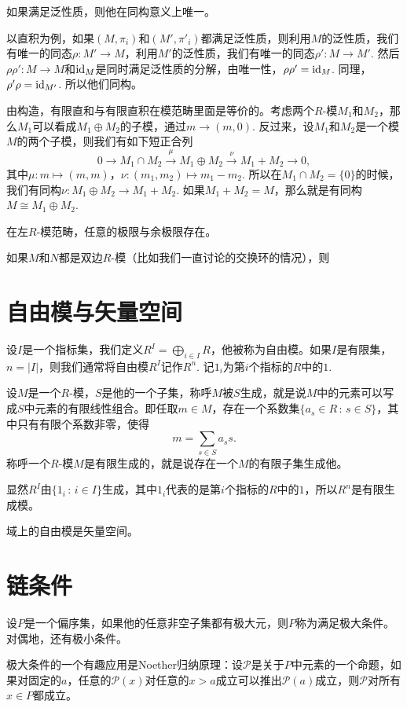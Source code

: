 \para 如果满足泛性质，则他在同构意义上唯一。

以直积为例，如果$(M,\pi_i)$和$(M',\pi'_i)$都满足泛性质，则利用$M$的泛性质，我们有唯一的同态$\rho:M'\to M$，利用$M'$的泛性质，我们有唯一的同态$\rho':M\to M'$. 然后$\rho \rho':M\to M$和$\operatorname{id}_M$是同时满足泛性质的分解，由唯一性，$\rho\rho'=\operatorname{id}_M$. 同理，$\rho'\rho=\operatorname{id}_{M'}$. 所以他们同构。

\para 由构造，有限直和与有限直积在模范畴里面是等价的。考虑两个$R$-模$M_1$和$M_2$，那么$M_1$可以看成$M_1\oplus M_2$的子模，通过$m\to (m,0)$. 反过来，设$M_1$和$M_2$是一个模$M$的两个子模，则我们有如下短正合列
\[
	0\to M_1\cap M_2 \xrightarrow{\mu} M_1\oplus M_2\xrightarrow{\nu} M_1+M_2\to 0,
\]
其中$\mu:m\mapsto (m,m)$，$\nu:(m_1,m_2)\mapsto m_1-m_2$. 所以在$M_1\cap M_2=\{0\}$的时候，我们有同构$\nu: M_1\oplus M_2\to M_1+M_2$. 如果$M_1+M_2=M$，那么就是有同构$M\cong M_1\oplus M_2$.

\theo 在左$R$-模范畴，任意的极限与余极限存在。 \notprove

\para 如果$M$和$N$都是双边$R$-模（比如我们一直讨论的交换环的情况），则

\section{自由模与矢量空间}

\para 设$I$是一个指标集，我们定义$R^I=\bigoplus_{i\in I}R$，他被称为自由模。如果$I$是有限集，$n=|I|$，则我们通常将自由模$R^I$记作$R^n$. 记$1_i$为第$i$个指标的$R$中的$1$.

\para 设$M$是一个$R$-模，$S$是他的一个子集，称呼$M$被$S$生成，就是说$M$中的元素可以写成$S$中元素的有限线性组合。即任取$m\in M$，存在一个系数集$\{a_s\in R\,:\, s\in S\}$，其中只有有限个系数非零，使得
\[
	m=\sum_{s\in S}a_s s.
\]
称呼一个$R$-模$M$是有限生成的，就是说存在一个$M$的有限子集生成他。

显然$R^I$由$\{1_i\,:\,i\in I\}$生成，其中$1_i$代表的是第$i$个指标的$R$中的$1$，所以$R^n$是有限生成模。

\para 域上的自由模是矢量空间。

\section{链条件}

\para 设$P$是一个偏序集，如果他的任意非空子集都有极大元，则$P$称为满足极大条件。对偶地，还有极小条件。

极大条件的一个有趣应用是Noether归纳原理：设$\mathcal{P}$是关于$P$中元素的一个命题，如果对固定的$a$，任意的$\mathcal{P}(x)$对任意的$x>a$成立可以推出$\mathcal{P}(a)$成立，则$\mathcal{P}$对所有$x\in P$都成立。

